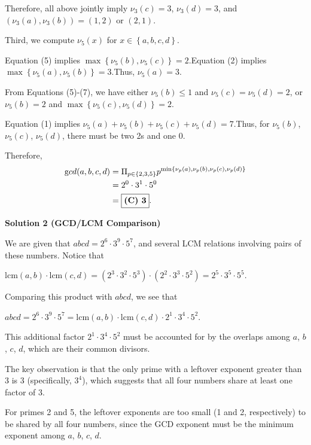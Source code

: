 \begin{enumerate}
 Therefore, all above jointly imply $\nu_3 (c) = 3$, $\nu_3 (d) = 3$, and $\left( \nu_3 (a), \nu_3 (b) \right) = \left( 1 , 2 \right)$ or $\left( 2, 1 \right)$.

 Third, we compute $\nu_5 (x)$ for $x \in \left\{ a, b, c, d \right\}$.

 
Equation (5) implies $\max \left\{ \nu_5 (b), \nu_5 (c) \right\} = 2$.Equation (2) implies $\max \left\{ \nu_5 (a), \nu_5 (b) \right\} = 3$.Thus, $\nu_5 (a) = 3$.

 From Equations (5)-(7), we have either $\nu_5 (b) \leq 1$ and $\nu_5 (c) = \nu_5 (d) = 2$, or $\nu_5 (b) = 2$ and $\max \left\{ \nu_5 (c), \nu_5 (d) \right\} = 2$.

 Equation (1) implies $\nu_5 (a) + \nu_5 (b) + \nu_5 (c) + \nu_5 (d) = 7$.Thus, for $\nu_5 (b)$, $\nu_5 (c)$, $\nu_5 (d)$, there must be two 2s and one 0.

 Therefore,
 \begin{align*} {\textrm gcd} (a,b,c,d) & = \Pi_{p \in \{ 2, 3, 5\}} p^{\min\{ \nu_p (a), \nu_p(b) , \nu_p (c), \nu_p(d) \}} \\ & = 2^0 \cdot 3^1 \cdot 5^0 \\ & = \boxed{\textbf{(C) 3}}. \end{align*}





\textbf{Solution 2 (GCD/LCM Comparison)}

We are given that $abcd = 2^6 \cdot 3^9 \cdot 5^7$, and several LCM relations involving pairs of these numbers. Notice that

 $\mathrm{lcm}(a,b) \cdot \mathrm{lcm}(c,d) = (2^3 \cdot 3^2 \cdot 5^3) \cdot (2^2 \cdot 3^3 \cdot 5^2) = 2^{5} \cdot 3^{5} \cdot 5^{5}.$

 Comparing this product with $abcd$, we see that

 $abcd = 2^6 \cdot 3^9 \cdot 5^7 = \mathrm{lcm}(a,b) \cdot \mathrm{lcm}(c,d) \cdot 2^1 \cdot 3^4 \cdot 5^2.$

 This additional factor $2^1 \cdot 3^4 \cdot 5^2$ must be accounted for by the overlaps among $a$, $b$, $c$, $d$, which are their common divisors.

 The key observation is that the only prime with a leftover exponent greater than 3 is 3 (specifically, $3^4$), which suggests that all four numbers share at least one factor of 3.

 For primes 2 and 5, the leftover exponents are too small (1 and 2, respectively) to be shared by all four numbers, since the GCD exponent must be the minimum exponent among $a$, $b$, $c$, $d$.


\end{enumerate}
